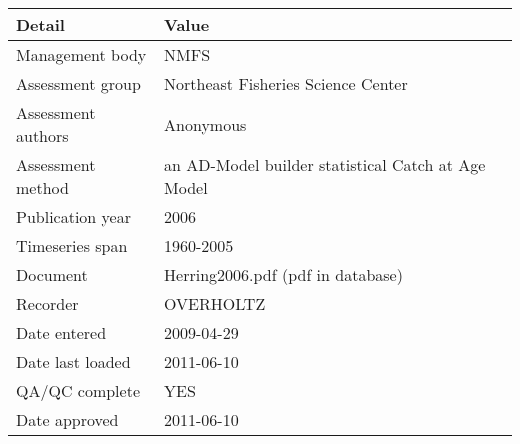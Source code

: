 \begin{table}[htb]
\centering
\begin{tabular}{lp{7cm}}
\toprule
Detail & Value \\
\midrule
Management body    & NMFS                                               \\
Assessment group   & Northeast Fisheries Science Center                 \\
Assessment authors & Anonymous                                          \\
Assessment method  & an AD-Model builder statistical Catch at Age Model \\
Publication year   & 2006                                               \\
Timeseries span    & 1960-2005                                          \\
Document           & Herring2006.pdf (pdf in database)                  \\
Recorder           & OVERHOLTZ                                          \\
Date entered       & 2009-04-29                                         \\
Date last loaded   & 2011-06-10                                         \\
QA/QC complete     & YES                                                \\
Date approved      & 2011-06-10                                         \\
\bottomrule
\end{tabular}
\label{tab:assessdet}
\end{table}
